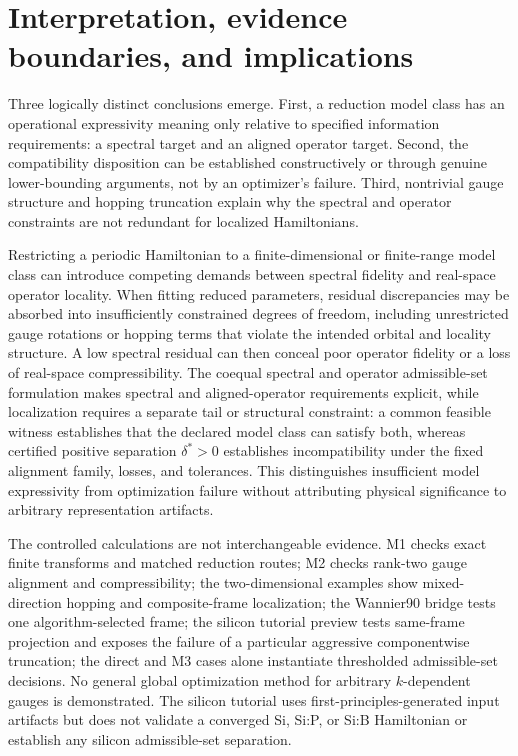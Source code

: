 \documentclass[11pt]{article}
\begin{document}
\section{Interpretation, evidence boundaries, and implications}
Three logically distinct conclusions emerge. First, a reduction model class has an operational expressivity meaning only relative to specified information requirements: a spectral target and an aligned operator target. Second, the compatibility disposition can be established constructively or through genuine lower-bounding arguments, not by an optimizer's failure. Third, nontrivial gauge structure and hopping truncation explain why the spectral and operator constraints are not redundant for localized Hamiltonians.

Restricting a periodic Hamiltonian to a finite-dimensional or finite-range model class can introduce competing demands between spectral fidelity and real-space operator locality. When fitting reduced parameters, residual discrepancies may be absorbed into insufficiently constrained degrees of freedom, including unrestricted gauge rotations or hopping terms that violate the intended orbital and locality structure. A low spectral residual can then conceal poor operator fidelity or a loss of real-space compressibility. The coequal spectral and operator admissible-set formulation makes spectral and aligned-operator requirements explicit, while localization requires a separate tail or structural constraint: a common feasible witness establishes that the declared model class can satisfy both, whereas certified positive separation $\delta^*>0$ establishes incompatibility under the fixed alignment family, losses, and tolerances. This distinguishes insufficient model expressivity from optimization failure without attributing physical significance to arbitrary representation artifacts.

The controlled calculations are not interchangeable evidence. M1 checks exact finite transforms and matched reduction routes; M2 checks rank-two gauge alignment and compressibility; the two-dimensional examples show mixed-direction hopping and composite-frame localization; the Wannier90 bridge tests one algorithm-selected frame; the silicon tutorial preview tests same-frame projection and exposes the failure of a particular aggressive componentwise truncation; the direct and M3 cases alone instantiate thresholded admissible-set decisions. No general global optimization method for arbitrary $k$-dependent gauges is demonstrated. The silicon tutorial uses first-principles-generated input artifacts but does not validate a converged Si, Si:P, or Si:B Hamiltonian or establish any silicon admissible-set separation.
\end{document}
